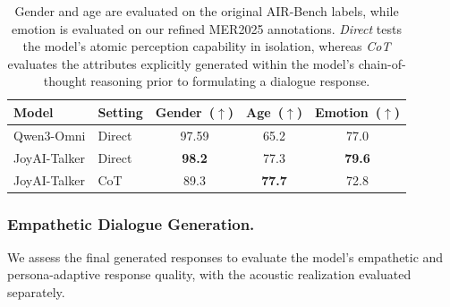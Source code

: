 \begin{table}[ht]
\centering
\small
\caption{Gender and age are evaluated on the original AIR-Bench labels, while emotion is evaluated on our refined MER2025 annotations. \textit{Direct} tests the model's atomic perception capability in isolation, whereas \textit{CoT} evaluates the attributes explicitly generated within the model's chain-of-thought reasoning prior to formulating a dialogue response.}
\label{tab:user_state_perception}
\begin{tabular}{l l ccc}
\toprule
Model & Setting & Gender~($\uparrow$) & Age~($\uparrow$) & Emotion~($\uparrow$) \\
\midrule
Qwen3-Omni & Direct & 97.59 & 65.2 & 77.0 \\
\midrule
JoyAI-Talker & Direct & \textbf{98.2} & 77.3 & \textbf{79.6} \\
JoyAI-Talker & CoT & 89.3 & \textbf{77.7} & 72.8 \\
\bottomrule
\end{tabular}
\end{table}




\subsubsection{Empathetic Dialogue Generation.}


We assess the final generated responses to evaluate the model's empathetic and persona-adaptive response quality, with the acoustic realization evaluated separately.

